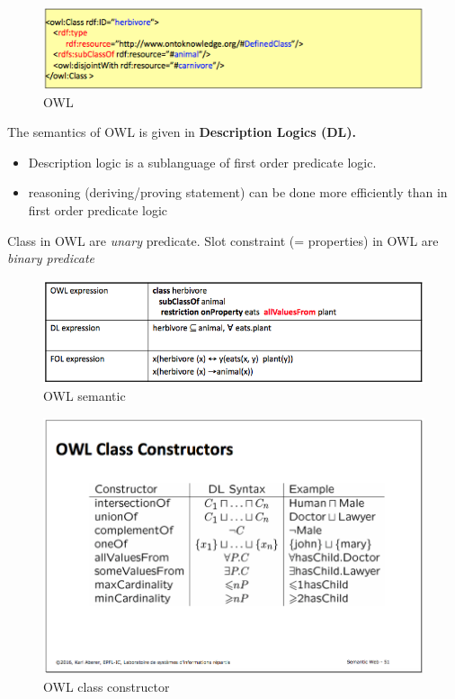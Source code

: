 \begin{figure}[H]
\begin{center}
\includegraphics[width=1\linewidth]{figures/owl.png}
\end{center}
\caption{OWL}
\end{figure}

The semantics of OWL is given in \bf{Description Logics (DL)}. 
\begin{itemize}
	\item Description logic is a sublanguage of first order predicate logic. 
	\item reasoning (deriving/proving statement) can be done more efficiently than in first order predicate logic
\end{itemize}



Class in OWL are \textit{unary} predicate. Slot constraint (= properties) in OWL are \textit{binary predicate}

\begin{figure}[H]
\begin{center}
\includegraphics[width=1\linewidth]{figures/semantic_owl.png}
\end{center}
\caption{OWL semantic}
\end{figure}

\begin{figure}[H]
\begin{center}
\includegraphics[width=1\linewidth]{figures/owl_class.png}
\end{center}
\caption{OWL class constructor}
\end{figure}

